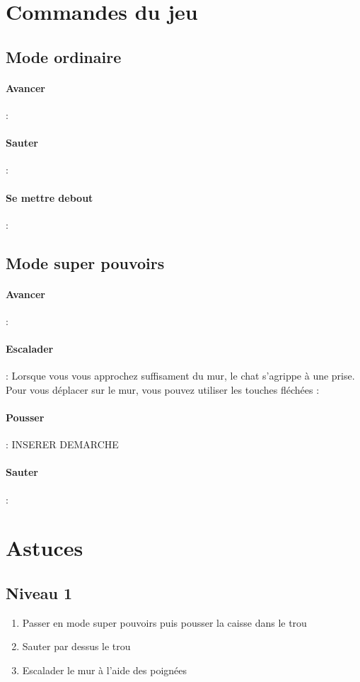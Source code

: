 \documentclass[a4paper,11pt]{article}
\begin{document}
\section{Commandes du jeu}
\subsection{Mode ordinaire}
\paragraph{Avancer }: \fbox{$\rightarrow$}

\paragraph{Sauter} : 

\paragraph{Se mettre debout} : 
\subsection{Mode super pouvoirs}
\paragraph{Avancer} : \fbox{$\rightarrow$}

\paragraph{Escalader} : Lorsque vous vous approchez suffisament du mur, le chat s'agrippe à une prise. Pour vous déplacer sur le mur, vous pouvez utiliser les touches fléchées : \fbox{$\uparrow$} \fbox{$\rightarrow$} \fbox{$\downarrow$} \fbox{$\leftarrow$}

\paragraph{Pousser} : INSERER DEMARCHE 

\paragraph{Sauter} : 



\section{Astuces}
\subsection{Niveau 1}
\begin{enumerate}
\item Passer en mode super pouvoirs puis pousser la caisse dans le trou
\item Sauter par dessus le trou
\item Escalader le mur à l'aide des poignées
\end{enumerate}
\end{document}
